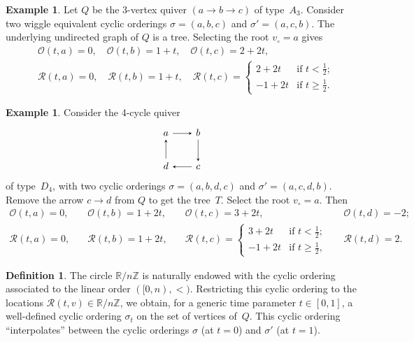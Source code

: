 \documentclass[11pt, letterpaper]{amsart}
\newcommand{\cS}[1]{{\noindent\textsf{\color{purple}$\blacksquare$~#1~$\blacksquare$}}}
\theoremstyle{definition}
\newtheorem{example}[theorem]{Example}
\newtheorem{definition}[theorem]{Definition}
\numberwithin{equation}{section}
\def\ZZ{{\mathbb Z}}
\def\RR{{\mathbb R}}
\def\O{{\mathcal{O}}}
\begin{document}
\begin{example}
\label{eg:tree wiggle equiv-1}
Let $Q$ be the 3-vertex quiver $(a\rightarrow b \rightarrow c)$ of type~$A_3$.
Consider two wiggle equivalent cyclic orderings 
$\sigma = (a,b,c)$ and $\sigma' = (a,c,b)$. 
The underlying undirected graph of $Q$ is a tree. 
Selecting the root $v_\circ=a$ gives 
\begin{align*}
&\O(t,a) = 0, \quad \O(t,b)= 1+t, \quad \O(t,c)= 2+2t, \\
&\mathcal{R}(t,a) = 0, \quad \mathcal{R}(t,b)= 1+t, \quad \mathcal{R}(t,c)= \begin{cases}
2+2t & \text{if $t<\frac12$;} \\ -1+2t & \text{if $t\ge\frac12$.}
\end{cases}
\end{align*}
\end{example}

\begin{example}
\label{eg:4cycle wiggle equiv-1}
Consider the 4-cycle quiver 
\begin{equation*}
\begin{tikzcd}[arrows={-stealth}, sep=2em]
  a  \arrow[r] & b \arrow[d]  \\
 d\arrow[u]  & c   \arrow[l] 
\end{tikzcd}
\end{equation*}
of type~$D_4$, 
with two cyclic orderings $\sigma = (a,b,d,c)$ and $\sigma' = (a,c,d,b)$. 
Remove the arrow $c\rightarrow d$ from $Q$ to get the tree~$T$. 
Select the root $v_\circ=a$. 
Then 
\begin{equation*}
\begin{array}{llll}
\O(t,a) = 0, \quad & \O(t,b) = 1+2t, \quad & \O(t,c) = 3+2t, \quad & \O(t,d) = -2; \\[5pt]
\mathcal{R}(t,a) = 0, \quad & \mathcal{R}(t,b)=1+2t, \quad & \mathcal{R}(t,c) =\begin{cases}
3+2t & \text{if $t<\frac12$;} \\ -1+2t & \text{if $t\ge\frac12$,}
\end{cases}
\quad &\mathcal{R}(t,d)=2. 
\end{array} 
\end{equation*}
\end{example}


\begin{definition}
\label{def: Z/nZ circle ordering}
The circle $\RR/n\ZZ$ is naturally endowed with the cyclic ordering associated to the linear order $([0,n), <)$. 
Restricting this cyclic ordering to the locations $\mathcal{R}(t,v)\in\RR / n \ZZ$, we obtain, for a generic time parameter
$t\in [0,1]$, a well-defined cyclic ordering $\sigma_t$ on the set of vertices of~$Q$. 
This cyclic ordering ``interpolates'' between the cyclic orderings $\sigma$ (at $t=0$) and $\sigma'$ (at $t=1$). 
\end{definition}
\end{document}

